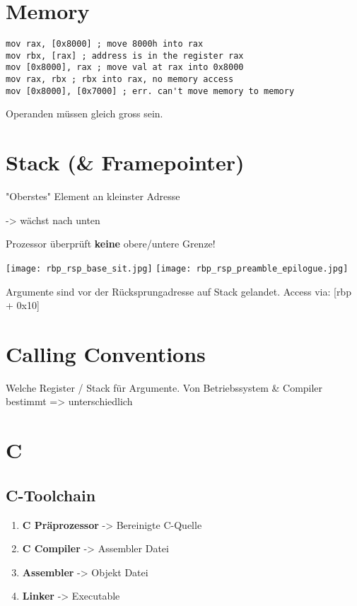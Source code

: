 \begin{multicols*}{4}
\section{Memory}
\begin{lstlisting}[language={[x86masm]Assembler}]
mov rax, [0x8000] ; move 8000h into rax
mov rbx, [rax] ; address is in the register rax
mov [0x8000], rax ; move val at rax into 0x8000
mov rax, rbx ; rbx into rax, no memory access
mov [0x8000], [0x7000] ; err. can't move memory to memory
\end{lstlisting}
Operanden müssen gleich gross sein.

\section{Stack (\& Framepointer)}
"Oberstes" Element an kleinster Adresse

-> wächst nach unten

Prozessor überprüft \textbf{keine} obere/untere Grenze!

\texttt{[image: rbp\_rsp\_base\_sit.jpg]}
\texttt{[image: rbp\_rsp\_preamble\_epilogue.jpg]}

Argumente sind vor der Rücksprungadresse auf Stack gelandet. Access via: [rbp + 0x10]

\section{Calling Conventions}
Welche Register / Stack für Argumente. Von Betriebssystem \& Compiler bestimmt => unterschiedlich

\section{C}
\subsection{C-Toolchain}
\begin{enumerate}
    \item \textbf{C Präprozessor} -> Bereinigte C-Quelle
    \item \textbf{C Compiler} -> Assembler Datei
    \item \textbf{Assembler} -> Objekt Datei
    \item \textbf{Linker} -> Executable
\end{enumerate}

\end{multicols*}
